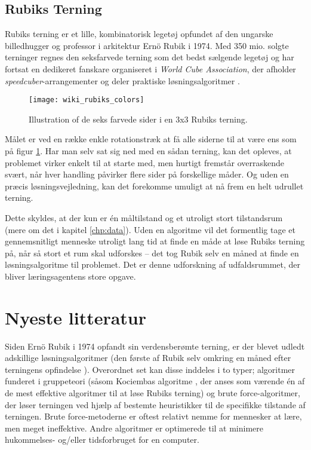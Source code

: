 \documentclass[../main.tex]{subfiles}
\begin{document}
\subsection*{Rubiks Terning}

Rubiks terning er et lille, kombinatorisk legetøj opfundet af den ungarske billedhugger og professor i arkitektur Ernö Rubik i 1974. Med 350 mio. solgte terninger regnes den seksfarvede terning som det bedst sælgende legetøj og har fortsat en dedikeret fanskare organiseret i \textit{World Cube Association}, der afholder \textit{speedcuber}-arrangementer og deler praktiske løsningsalgoritmer \cite{RubiksWiki}. 
\begin{figure}[H]
	\centering 
	\texttt{[image: wiki\_rubiks\_colors]}
	\caption{Illustration of de seks farvede sider i en 3x3 Rubiks terning.\protect\footnotemark}\label{fig:rubcolours}
\end{figure}
\noindent Målet er ved en række enkle rotationstræk at få alle siderne til at være ens som på figur \ref{fig:rubcolours}. 
Har man selv sat sig ned med en sådan terning, kan det opleves, at problemet virker enkelt til at starte med, men hurtigt fremstår overraskende svært, når hver handling påvirker flere sider på forskellige måder. Og uden en præcis løsningsvejledning, kan det forekomme umuligt at nå frem en helt udrullet terning.

Dette skyldes, at der kun er én måltilstand og et utroligt stort tilstandsrum (mere om det i kapitel \ref{chp:data}).
Uden en algoritme vil det formentlig tage et gennemsnitligt menneske utroligt lang tid at finde en måde at løse Rubiks terning på, når så stort et rum skal udforskes -- det tog Rubik selv en måned at finde en 
løsningsalgoritme til problemet. 
Det er denne udforskning af udfaldsrummet, der bliver læringsagentens store opgave. 



\section{Nyeste litteratur}

Siden Ernö Rubik i 1974 opfandt sin verdensberømte terning, er der blevet udledt adskillige løsningsalgoritmer (den første af Rubik selv omkring en måned efter terningens opfindelse \cite{ErnoRubik}). 
Overordnet set kan disse inddeles i to typer; 
algoritmer funderet i gruppeteori (såsom Kociembas algoritme \cite{Kociemba}, der anses som værende én af de mest effektive algoritmer til at løse Rubiks terning) og brute force-algoritmer, der løser terningen ved hjælp af bestemte heuristikker til de specifikke tilstande af terningen.  
Brute force-metoderne er oftest relativt nemme for mennesker at lære, men meget ineffektive. 
Andre algoritmer er optimerede til at minimere hukommelses- og/eller tidsforbruget for en computer.  
\end{document}
